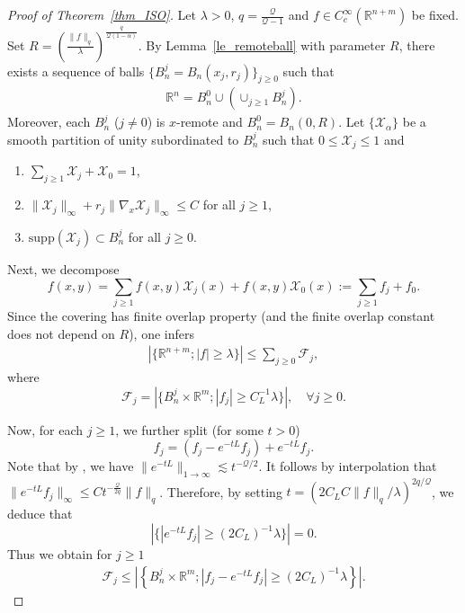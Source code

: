 \documentclass[12pt]{amsart}
\theoremstyle{plain}
\theoremstyle{definition}
\numberwithin{equation}{section}
\begin{document}
\begin{proof}[Proof of Theorem~\ref{thm_ISO}]
    

Let $\lambda>0$, $q=\frac{\mathcal{Q}}{\mathcal{Q}-1}$ and $f\in C_c^\infty(\mathbb{R}^{n+m})$ be fixed. Set $R = \left(\frac{\|f\|_q}{\lambda}\right)^{\frac{q}{\mathcal{Q}(1-\alpha)}}$. By Lemma~\ref{le_remoteball} with parameter $R$, there exists a sequence of balls $\{B_n^{j}=B_n(x_j,r_j)\}_{j \ge 0}$ such that
\begin{align*}
    \mathbb{R}^n = B_n^0 \cup \left(\cup_{j \ge 1}B_n^{j} \right).
\end{align*}
Moreover, each $B_n^{j}$ ($j \ne0$) is $x$-remote and $B_n^0 = B_n(0,R)$. Let $\{\mathcal{X}_\alpha\}$ be a smooth partition of unity subordinated to $B_n^{j}$ such that $0\le \mathcal{X}_j \le 1$ and
\begin{enumerate}
    \item $\sum_{j\ge 1} \mathcal{X}_{j} + \mathcal{X}_{0} = 1$,
    \item $\|\mathcal{X}_j\|_\infty +  r_j \|\nabla_x \mathcal{X}_j\|_\infty \le C$ for all $j\ge 1$,
    \item $\textrm{supp}(\mathcal{X}_j) \subset B_n^{j}$ for all $j\ge 0$.
\end{enumerate}
Next, we decompose
\begin{equation*}
    f(x,y) = \sum_{j\ge 1} f(x,y) \mathcal{X}_j(x) + f(x,y)\mathcal{X}_{0}(x):= \sum_{j \ge 1} f_j + f_{0}.
\end{equation*}
Since the covering has finite overlap property (and the finite overlap constant does not depend on $R$), one infers
\begin{align}\label{eqlast}
    \left| \{\mathbb{R}^{n+m}; |f|\ge \lambda\} \right| \le \sum_{j\ge 0} \mathcal{F}_j,
\end{align}
where
\begin{equation*}
    \mathcal{F}_j = \left| \{B_n^{j} \times \mathbb{R}^m; |f_j|\ge C_L^{-1}\lambda\} \right|,\quad \forall j\ge 0.
\end{equation*}


Now, for each $j \ge 1$, we further split (for some $t>0$)
\begin{equation*}
    f_j = \left( f_j - e^{-tL}f_j \right) + e^{-tL}f_j.
\end{equation*}
Note that by \cite[Prop~3.1]{DS2}, we have $\|e^{-tL}\|_{1\to \infty}\lesssim t^{-\mathcal{Q}/2}$. It follows by interpolation that $\|e^{-tL}f_j\|_\infty \le C t^{-\frac{\mathcal{Q}}{2q}} \|f\|_q$. Therefore, by setting $t = \left(2C_L C \|f\|_q/\lambda\right)^{2q/\mathcal{Q}}$, we deduce that
$$
\left|\{|e^{-tL}f_j|\ge (2C_L)^{-1}\lambda\}\right|= 0.
$$
Thus we obtain for $j\ge 1$
\begin{align}\label{eq_thm_main1}
    \mathcal{F}_j \le \left|\left\{B_n^{j} \times \mathbb{R}^m; |f_j - e^{-tL}f_j| \ge (2C_L)^{-1}\lambda  \right\}\right|.
\end{align}


\end{proof}
\end{document}
